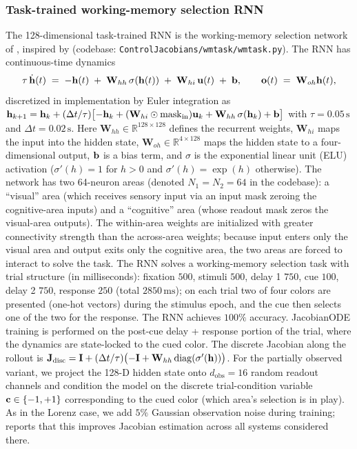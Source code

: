 \subsubsection{Task-trained working-memory selection RNN}\label{supp:interareal-control-wmtask}

The 128-dimensional task-trained RNN is the working-memory selection network of \cite{Eisen2025-wt}, inspired by \cite{Panichello2021-xi} (codebase: \texttt{ControlJacobians/wmtask/wmtask.py}). The RNN has continuous-time dynamics
\begin{equation}
\tau\,\dot{\vb{h}}(t) \;=\; -\vb{h}(t)\;+\;\mathbf{W}_{hh}\,\sigma(\vb{h}(t))\;+\;\mathbf{W}_{hi}\,\vb{u}(t)\;+\;\vb{b}, \qquad \vb{o}(t)\;=\;\mathbf{W}_{oh}\vb{h}(t),
\end{equation}
discretized in implementation by Euler integration as $\vb{h}_{k+1}=\vb{h}_{k}+(\Delta t/\tau)\bigl[-\vb{h}_{k}+(\mathbf{W}_{hi}\odot \mathrm{mask}_{\mathrm{in}})\vb{u}_{k}+\mathbf{W}_{hh}\,\sigma(\vb{h}_{k})+\vb{b}\bigr]$ with $\tau=0.05\,\mathrm{s}$ and $\Delta t=0.02\,\mathrm{s}$. Here $\mathbf{W}_{hh}\in\mathbb{R}^{128\times 128}$ defines the recurrent weights, $\mathbf{W}_{hi}$ maps the input into the hidden state, $\mathbf{W}_{oh}\in\mathbb{R}^{4\times 128}$ maps the hidden state to a four-dimensional output, $\vb{b}$ is a bias term, and $\sigma$ is the exponential linear unit (ELU) activation ($\sigma'(h)=1$ for $h>0$ and $\sigma'(h)=\exp(h)$ otherwise). The network has two 64-neuron areas (denoted $N_{1}=N_{2}=64$ in the codebase): a ``visual'' area (which receives sensory input via an input mask zeroing the cognitive-area inputs) and a ``cognitive'' area (whose readout mask zeros the visual-area outputs). The within-area weights are initialized with greater connectivity strength than the across-area weights; because input enters only the visual area and output exits only the cognitive area, the two areas are forced to interact to solve the task. The RNN solves a working-memory selection task with trial structure (in milliseconds): fixation $500$, stimuli $500$, delay 1 $750$, cue $100$, delay 2 $750$, response $250$ (total $2850\,\mathrm{ms}$); on each trial two of four colors are presented (one-hot vectors) during the stimulus epoch, and the cue then selects one of the two for the response. The RNN achieves $100\%$ accuracy. JacobianODE training is performed on the post-cue delay + response portion of the trial, where the dynamics are state-locked to the cued color. The discrete Jacobian along the rollout is $\mathbf{J}_{\mathrm{disc}}=\mathbf{I}+(\Delta t/\tau)\bigl(-\mathbf{I}+\mathbf{W}_{hh}\,\mathrm{diag}(\sigma'(\vb{h}))\bigr)$. For the partially observed variant, we project the 128-D hidden state onto $d_{\mathrm{obs}}=16$ random readout channels and condition the model on the discrete trial-condition variable $\vb{c}\in\{-1,+1\}$ corresponding to the cued color (which area's selection is in play). As in the Lorenz case, we add $5\%$ Gaussian observation noise during training; \cite{Eisen2025-wt} reports that this improves Jacobian estimation across all systems considered there.

